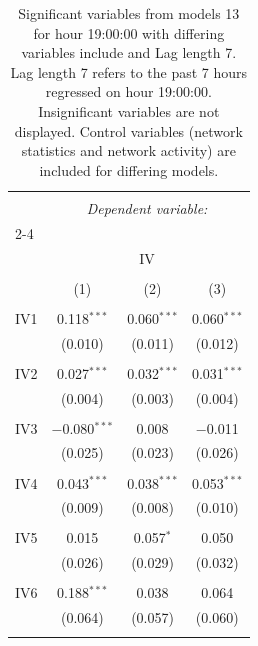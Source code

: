 
\begin{table}[!htbp] \centering 
  \caption{Significant variables from models 13 for hour 19:00:00 with differing variables include 
                               and Lag length 7. Lag length 7 refers to the past 7 hours regressed on hour 19:00:00. 
                               Insignificant variables are not displayed. 
                               Control variables (network statistics and network activity) are 
                               included for differing models.} 
  \label{IVmodels2_t_hourlagged6} 
\scriptsize 
\begin{tabular}{@{\extracolsep{5pt}}lccc} 
\\[-1.8ex]\hline 
\hline \\[-1.8ex] 
 & \multicolumn{3}{c}{\textit{Dependent variable:}} \\ 
\cline{2-4} 
\\[-1.8ex] & \multicolumn{3}{c}{IV} \\ 
\\[-1.8ex] & (1) & (2) & (3)\\ 
\hline \\[-1.8ex] 
 IV1 & 0.118$^{***}$ & 0.060$^{***}$ & 0.060$^{***}$ \\ 
  & (0.010) & (0.011) & (0.012) \\ 
  & & & \\ 
 IV2 & 0.027$^{***}$ & 0.032$^{***}$ & 0.031$^{***}$ \\ 
  & (0.004) & (0.003) & (0.004) \\ 
  & & & \\ 
 IV3 & $-$0.080$^{***}$ & 0.008 & $-$0.011 \\ 
  & (0.025) & (0.023) & (0.026) \\ 
  & & & \\ 
 IV4 & 0.043$^{***}$ & 0.038$^{***}$ & 0.053$^{***}$ \\ 
  & (0.009) & (0.008) & (0.010) \\ 
  & & & \\ 
 IV5 & 0.015 & 0.057$^{*}$ & 0.050 \\ 
  & (0.026) & (0.029) & (0.032) \\ 
  & & & \\ 
 IV6 & 0.188$^{***}$ & 0.038 & 0.064 \\ 
  & (0.064) & (0.057) & (0.060) \\ 
  & & & \\ 

\end{tabular}
\end{table}
